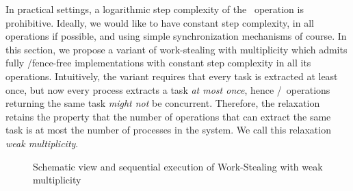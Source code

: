 In practical settings, a logarithmic step complexity of the \Take{}~operation is prohibitive. Ideally, we would like to have constant step complexity, in all operations if possible, and using simple synchronization mechanisms of course.  In this section, we propose a variant of work-stealing with multiplicity which admits fully \R/\W fence-free implementations with constant step complexity in all its operations.  Intuitively, the variant requires that every task is extracted at least once, but now every process extracts a task \emph{at most once}, hence \Take/\Steal~operations returning the same task \emph{might not} be concurrent.  Therefore, the relaxation retains the property that the number of operations that can extract the same task is at most the number of processes in the system.  We call this relaxation \emph{weak multiplicity}.

\begin{figure}[!ht]
  \centering
  \hfill
  \caption{\label{fig-weak-mult} Schematic view and sequential
    execution of Work-Stealing with weak multiplicity}
\end{figure}



